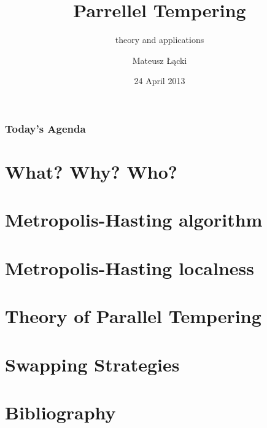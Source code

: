 \documentclass[xetex]{beamer}
\title[Parrellel Tempering]{Parrellel Tempering }
\subtitle{theory and applications}
\date{24 April 2013}
\author[Łącki]{Mateusz Łącki}
\institute[UW]{Uniwersytet Warszawski}
\begin{document}


	\begin{frame}
		\titlepage
	\end{frame}

	\begin{frame}
		\frametitle{Today's Agenda}
		\tableofcontents
	\end{frame}
	


	\section[Motivation]{What? Why? Who?}		
	

	\section[Metropolis-Hasting]{Metropolis-Hasting algorithm}

	\section[localness]{Metropolis-Hasting localness}
		
	
	\section[Theory]{Theory of Parallel Tempering}

	\section[Swaps]{Swapping Strategies}

	\section[Sources]{Bibliography}
		

\end{document}

